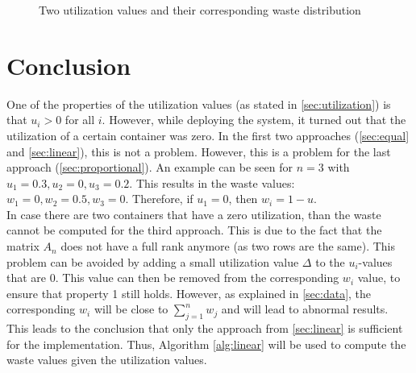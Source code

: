 \begin{figure}
{        \label{fig:approaches:B}%
    }
    \caption{Two utilization values and their corresponding waste distribution}
    \label{fig:approaches}
\end{figure}


\section{Conclusion} \label{sec:conclusion4}
One of the properties of the utilization values (as stated in \autoref{sec:utilization}) is that $u_i > 0$ for all $i$. However, while deploying the system, it turned out that the utilization of a certain container was zero. In the first two approaches (\autoref{sec:equal} and \autoref{sec:linear}), this is not a problem. However, this is a problem for the last approach (\autoref{sec:proportional}). An example can be seen for $n = 3$ with $u_1 = 0.3, u_2 = 0, u_3 = 0.2$. This results in the waste values: $w_1 = 0, w_2 = 0.5, w_3 = 0$. Therefore, if $u_1 = 0$, then $w_i = 1 - u$.\\

\noindent
In case there are two containers that have a zero utilization, than the waste cannot be computed for the third approach. This is due to the fact that the matrix $A_n$ does not have a full rank anymore (as two rows are the same). This problem can be avoided by adding a small utilization value $\Delta$ to the $u_i$-values that are $0$. This value can then be removed from the corresponding $w_i$ value, to ensure that property 1 still holds. However, as explained in \autoref{sec:data}, the corresponding $w_i$ will be close to $\sum_{j=1}^n w_j$ and will lead to abnormal results. This leads to the conclusion that only the approach from \autoref{sec:linear} is sufficient for the implementation. Thus, Algorithm \ref{alg:linear} will be used to compute the waste values given the utilization values.